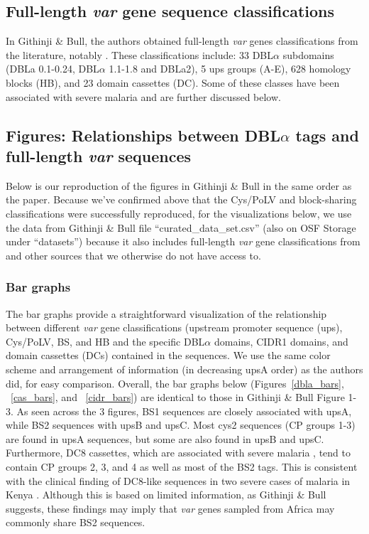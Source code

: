 \documentclass[10pt,twocolumn,superscriptaddress]{revtex4-1}
\newcommand{\var}{{\it var}\xspace}
\newcommand{\dbla}{{DBL$\alpha$}\xspace}
\newcommand{\cp}{{Cys/PoLV}\xspace}
\newcommand{\paper}{{Githinji \& Bull}\xspace}
\begin{document}
\subsection{Full-length \var gene sequence classifications}
In \paper \cite{githinji2017}, the authors obtained full-length \var genes classifications from the literature, notably \cite{rask2010}. These classifications include: 33 \dbla subdomains (DBLa 0.1-0.24, \dbla 1.1-1.8 and DBLa2), 5 ups groups (A-E), 628 homology blocks (HB), and 23 domain cassettes (DC). Some of these classes have been associated with severe malaria and are further discussed below. 

\subsection{Figures: Relationships between \dbla tags and full-length \var sequences}
Below is our reproduction of the figures in \paper in the same order as the paper. Because we've confirmed above that the \cp and block-sharing classifications were successfully reproduced, for the visualizations below, we use the data from \paper file ``curated\_data\_set.csv'' (also on OSF Storage under ``datasets'') because it also includes full-length \var gene classifications from \cite{rask2010} and other sources that we otherwise do not have access to. 


\subsubsection{Bar graphs}
The bar graphs provide a straightforward visualization of the relationship between different \var gene classifications (upstream promoter sequence (ups), \cp, BS, and HB and the specific \dbla domains, CIDR1 domains, and domain cassettes (DCs) contained in the sequences. We use the same color scheme and arrangement of information (in decreasing upsA order) as the authors did, for easy comparison. Overall, the bar graphs below (Figures~\ref{dbla_bars}, ~\ref{cas_bars}, and ~\ref{cidr_bars}) are identical to those in \paper Figure 1-3. As seen across the 3 figures, BS1 sequences are closely associated with upsA, while BS2 sequences with upsB and upsC. Most cys2 sequences (CP groups 1-3) are found in upsA sequences, but some are also found in upsB and upsC. Furthermore, DC8 cassettes, which are associated with severe malaria \cite{lavstsen2012, rask2010}, tend to contain CP groups 2, 3, and 4 as well as most of the BS2 tags. This is consistent with the clinical finding of DC8-like sequences in two severe cases of malaria in Kenya \cite{bull2005}. Although this is based on limited information, as \paper suggests, these findings may imply that \var genes sampled from Africa may commonly share BS2 sequences. 
\end{document}
